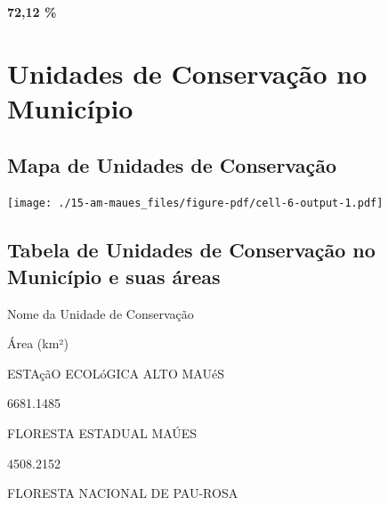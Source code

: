 \documentclass[
  letterpaper,
]{report}
\begin{document}
\textbf{72,12 \%}

\hypertarget{unidades-de-conservauxe7uxe3o-no-municuxedpio}{%
\section{Unidades de Conservação no
Município}\label{unidades-de-conservauxe7uxe3o-no-municuxedpio}}

\hypertarget{mapa-de-unidades-de-conservauxe7uxe3o}{%
\subsection{Mapa de Unidades de
Conservação}\label{mapa-de-unidades-de-conservauxe7uxe3o}}

\texttt{[image: ./15-am-maues\_files/figure-pdf/cell-6-output-1.pdf]}

\hypertarget{tabela-de-unidades-de-conservauxe7uxe3o-no-municuxedpio-e-suas-uxe1reas}{%
\subsection{Tabela de Unidades de Conservação no Município e suas
áreas}\label{tabela-de-unidades-de-conservauxe7uxe3o-no-municuxedpio-e-suas-uxe1reas}}

\n  

\n    

\n      

Nome da Unidade de Conservação

\n      

Área (km²)

\n    

\n  

\n  

\n    

\n      

ESTAçãO ECOLóGICA ALTO MAUéS

\n      

6681.1485

\n    

\n    

\n      

FLORESTA ESTADUAL MAÚES

\n      

4508.2152

\n    

\n    

\n      

FLORESTA NACIONAL DE PAU-ROSA

\n      
\end{document}
